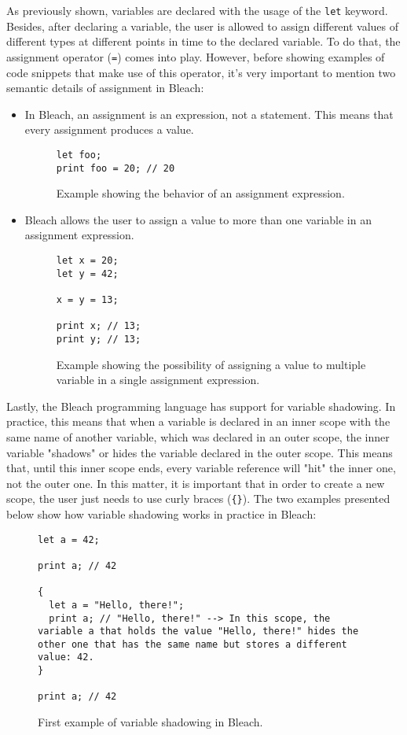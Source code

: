As previously shown, variables are declared with the usage of the \texttt{let} keyword. Besides, after declaring a variable, the user is allowed to assign different values of different types at different points in time to the declared variable. To do that, the assignment operator (\texttt{=}) comes into play. However, before showing examples of code snippets that make use of this operator, it's very important to mention two semantic details of assignment in Bleach:
\begin{itemize}
    \item In Bleach, an assignment is an expression, not a statement. This means that every assignment produces a value.
    \begin{figure}[H]
        \centering
        \begin{lstlisting}
let foo;
print foo = 20; // 20
        \end{lstlisting}
        \caption{Example showing the behavior of an assignment expression.}
    \end{figure}
    
    \item Bleach allows the user to assign a value to more than one variable in an assignment expression.
    \begin{figure}[H]
        \centering
        \begin{lstlisting}
let x = 20;
let y = 42;

x = y = 13;

print x; // 13;
print y; // 13;
        \end{lstlisting}
        \caption{Example showing the possibility of assigning a value to multiple variable in a single assignment expression.}
    \end{figure}
\end{itemize}

Lastly, the Bleach programming language has support for variable shadowing. In practice, this means that when a variable is declared in an inner scope with the same name of another variable, which was declared in an outer scope, the inner variable "shadows" or hides the variable declared in the outer scope. This means that, until this inner scope ends, every variable reference will "hit" the inner one, not the outer one. In this matter, it is important that in order to create a new scope, the user just needs to use curly braces (\texttt{\{\}}). The two examples presented below show how variable shadowing works in practice in Bleach:
\begin{figure}[H]
    \centering
    \begin{lstlisting}
let a = 42;

print a; // 42

{
  let a = "Hello, there!";
  print a; // "Hello, there!" --> In this scope, the variable a that holds the value "Hello, there!" hides the other one that has the same name but stores a different value: 42.
}

print a; // 42
    \end{lstlisting}
    \caption{First example of variable shadowing in Bleach.}
\end{figure}

